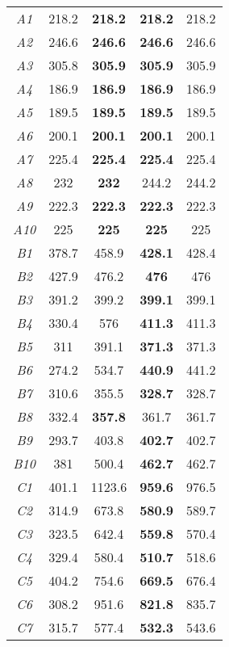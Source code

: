 {\begin{longtable}{ccccc}
\emph{A1}	&	218.2	&	\textbf{218.2}	&	\textbf{218.2}	&	218.2	\\
\emph{A2}	&	246.6	&	\textbf{246.6}	&	\textbf{246.6}	&	246.6	\\
\emph{A3}	&	305.8	&	\textbf{305.9}		&	\textbf{305.9}	&	305.9	\\
\emph{A4}	&	186.9	&	\textbf{186.9}	&	\textbf{186.9}	&	186.9	\\
\emph{A5}	&	189.5	&	\textbf{189.5}	&	\textbf{189.5}	&	189.5	\\
\emph{A6}	&	200.1	&	\textbf{200.1}	&	\textbf{200.1}	&	200.1	\\
\emph{A7}	&	225.4	&	\textbf{225.4}	&	\textbf{225.4}	&	225.4	\\
\emph{A8}	&	232	&	\textbf{232}	&	244.2	&	244.2	\\
\emph{A9}	&	222.3	&	\textbf{222.3}	&	\textbf{222.3}	&	222.3	\\
\emph{A10}	&	225	&	\textbf{225}	&	\textbf{225}	&	225	\\ \hline
\emph{B1}	&	378.7	&	458.9		&	\textbf{428.1}	&	428.4	\\
\emph{B2}	&	427.9	&	476.2		&	\textbf{476}	&	476	\\
\emph{B3}	&	391.2	&	399.2		&	\textbf{399.1}	&	399.1	\\
\emph{B4}	&	330.4	&	576		&	\textbf{411.3}	&	411.3	\\
\emph{B5}	&	311	&	391.1		&	\textbf{371.3}	&	371.3	\\
\emph{B6}	&	274.2	&	534.7		&	\textbf{440.9}	&	441.2	\\
\emph{B7}	&	310.6	&	355.5		&	\textbf{328.7}	&	328.7	\\
\emph{B8}	&	332.4	&	\textbf{357.8}		&	361.7	&	361.7	\\
\emph{B9}	&	293.7	&	403.8		&	\textbf{402.7}	&	402.7	\\
\emph{B10}	&	381	&	500.4		&	\textbf{462.7}	&	462.7	\\ \hline
\emph{C1}	&	401.1	&	1123.6		&	\textbf{959.6}	&	976.5	\\
\emph{C2}	&	314.9	&	673.8		&	\textbf{580.9}	&	589.7	\\
\emph{C3}	&	323.5	&	642.4		&	\textbf{559.8}	&	570.4	\\
\emph{C4}	&	329.4	&	580.4		&	\textbf{510.7}	&	518.6	\\
\emph{C5}	&	404.2	&	754.6		&	\textbf{669.5}	&	676.4	\\
\emph{C6}	&	308.2	&	951.6		&	\textbf{821.8}	&	835.7	\\
\emph{C7}	&	315.7	&	577.4		&	\textbf{532.3}	&	543.6	\\

\end{longtable}}
